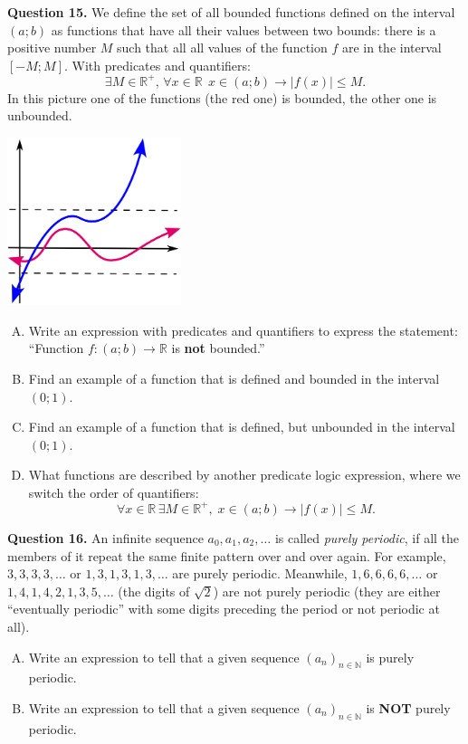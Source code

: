 \documentclass[jou]{apa6}
\begin{document}
{\bf Question 15.} We define the set of all bounded functions defined on the interval $(a;b)$ 
as functions that have all their values between two bounds: there is a positive number $M$
such that all all values of the function $f$ are in the interval $[-M;M]$. With predicates and quantifiers:
$$\exists M \in \mathbb{R}^{+},\,\forall x \in \mathbb{R}\,\;x \in (a;b) \rightarrow |f(x)| \leq M.$$
In this picture one of the functions (the red one) is bounded, the other one is unbounded.
\begin{center}
\includegraphics[width=2in]{midterm/bounded-function.png}
\end{center}
\begin{enumerate}[(A)]
\item Write an expression with predicates and quantifiers to express the statement: 
``Function $f:(a;b) \rightarrow \mathbb{R}$ is {\bf not} bounded.''
\item Find an example of a function that is defined and bounded in the interval $(0;1)$. 
\item Find an example of a function that is defined, but unbounded in the interval $(0;1)$. 
\item What functions are described by another predicate logic expression, where we switch the order of quantifiers:
$$\forall x \in \mathbb{R}\,\exists M \in \mathbb{R}^{+},\;x \in (a;b) \rightarrow |f(x)| \leq M.$$
\end{enumerate}


\vspace{6pt}
{\bf Question 16.} An infinite sequence $a_0,a_1,a_2,\ldots$ is called {\em purely periodic}, if 
all the members of it repeat the same finite pattern over and over again. 
For example, $3,3,3,3,\ldots$ or $1,3,1,3,1,3,\ldots$ are purely periodic. 
Meanwhile, 
$1,6,6,6,6,\ldots$ or $1,4,1,4,2,1,3,5,\ldots$ (the digits of $\sqrt{2}$) 
are not purely periodic (they are either ``eventually periodic'' with some digits preceding the period 
or not periodic at all). 
\begin{enumerate}[(A)]
\item Write an expression to tell that a given sequence $(a_n)_{n \in \mathbb{N}}$ 
is purely periodic. 
\item Write an expression to tell that a given sequence $(a_n)_{n \in \mathbb{N}}$ 
is {\bf NOT} purely periodic. 
\end{enumerate}
\end{document}
